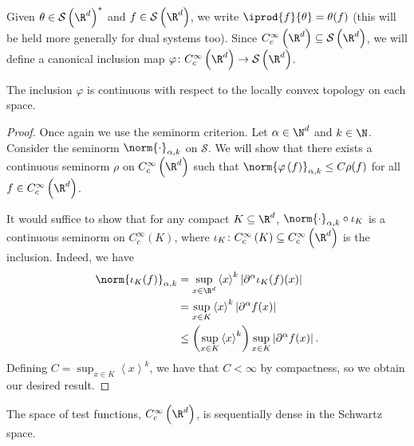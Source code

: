 \documentclass[10pt]{mypackage}
\begin{document}
Given $\theta\in \mathcal{S}\left( \R^d \right)^{\ast}$ and $f\in \mathcal{S}\left( \R^d \right)$, we write $ \iprod{f}{\theta} = \theta(f) $ (this will be held more generally for dual systems too). Since $ C_c^{\infty}\left( \R^d \right)\subseteq \mathcal{S}\left( \R^d \right) $, we will define a canonical inclusion map $\varphi\colon C_c^{\infty}\left( \R^d \right)\rightarrow \mathcal{S}\left( \R^d \right)$.
\begin{theorem}
  The inclusion $\varphi$ is continuous with respect to the locally convex topology on each space.
\end{theorem}
\begin{proof}
  Once again we use the seminorm criterion. Let $\alpha\in \N^d$ and $k\in \N$. Consider the seminorm $\norm{\cdot}_{\alpha,k}$ on $ \mathcal{S} $. We will show that there exists a continuous seminorm $\rho$ on $C_c^{\infty}\left( \R^d \right)$ such that $\norm{\varphi\left( f \right)}_{\alpha,k}\leq C\rho(f)$ for all $f\in C_c^{\infty}\left( \R^d \right)$.

  It would suffice to show that for any compact $K\subseteq \R^d$, $\norm{\cdot}_{\alpha,k}\circ \iota_K$ is a continuous seminorm on $C_c^{\infty}\left( K \right)$, where $\iota_K\colon C_c^{\infty}\left( K \right)\subseteq C_c^{\infty}\left( \R^d \right)$ is the inclusion. Indeed, we have
  \begin{align*}
    \norm{\iota_K(f)}_{\alpha,k} &= \sup_{x\in \R^d}  \left\langle x \right\rangle^{k} \left\vert \partial^{\alpha}\iota_K(f)(x) \right\vert\\
                                 &= \sup_{x\in K} \left\langle x \right\rangle^{k} \left\vert \partial^{\alpha}f(x) \right\vert\\
                                 &\leq \left( \sup_{x\in K}\left\langle x \right\rangle^{k} \right)\sup_{x\in K} \left\vert \partial^{\alpha}f(x) \right\vert.
  \end{align*}
  Defining $C = \sup_{x\in K} \left\langle x \right\rangle^{k}$, we have that $C < \infty$ by compactness, so we obtain our desired result.
\end{proof}
\begin{theorem}
  The space of test functions, $C_c^{\infty}\left( \R^d \right)$, is sequentially dense in the Schwartz space.
\end{theorem}
\end{document}
